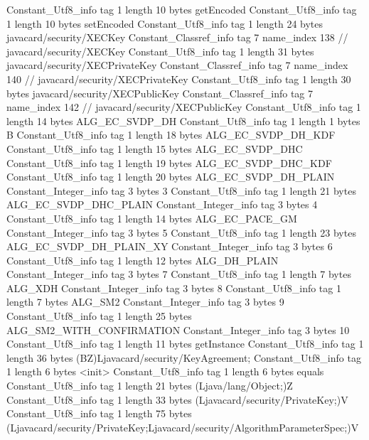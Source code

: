 {{{		}
		Constant_Utf8_info {
			tag	1
			length	10
			bytes	getEncoded
		}
		Constant_Utf8_info {
			tag	1
			length	10
			bytes	setEncoded
		}
		Constant_Utf8_info {
			tag	1
			length	24
			bytes	javacard/security/XECKey
		}
		Constant_Classref_info {
			tag	7
			name_index	138		// javacard/security/XECKey
		}
		Constant_Utf8_info {
			tag	1
			length	31
			bytes	javacard/security/XECPrivateKey
		}
		Constant_Classref_info {
			tag	7
			name_index	140		// javacard/security/XECPrivateKey
		}
		Constant_Utf8_info {
			tag	1
			length	30
			bytes	javacard/security/XECPublicKey
		}
		Constant_Classref_info {
			tag	7
			name_index	142		// javacard/security/XECPublicKey
		}
		Constant_Utf8_info {
			tag	1
			length	14
			bytes	ALG_EC_SVDP_DH
		}
		Constant_Utf8_info {
			tag	1
			length	1
			bytes	B
		}
		Constant_Utf8_info {
			tag	1
			length	18
			bytes	ALG_EC_SVDP_DH_KDF
		}
		Constant_Utf8_info {
			tag	1
			length	15
			bytes	ALG_EC_SVDP_DHC
		}
		Constant_Utf8_info {
			tag	1
			length	19
			bytes	ALG_EC_SVDP_DHC_KDF
		}
		Constant_Utf8_info {
			tag	1
			length	20
			bytes	ALG_EC_SVDP_DH_PLAIN
		}
		Constant_Integer_info {
			tag	3
			bytes	3
		}
		Constant_Utf8_info {
			tag	1
			length	21
			bytes	ALG_EC_SVDP_DHC_PLAIN
		}
		Constant_Integer_info {
			tag	3
			bytes	4
		}
		Constant_Utf8_info {
			tag	1
			length	14
			bytes	ALG_EC_PACE_GM
		}
		Constant_Integer_info {
			tag	3
			bytes	5
		}
		Constant_Utf8_info {
			tag	1
			length	23
			bytes	ALG_EC_SVDP_DH_PLAIN_XY
		}
		Constant_Integer_info {
			tag	3
			bytes	6
		}
		Constant_Utf8_info {
			tag	1
			length	12
			bytes	ALG_DH_PLAIN
		}
		Constant_Integer_info {
			tag	3
			bytes	7
		}
		Constant_Utf8_info {
			tag	1
			length	7
			bytes	ALG_XDH
		}
		Constant_Integer_info {
			tag	3
			bytes	8
		}
		Constant_Utf8_info {
			tag	1
			length	7
			bytes	ALG_SM2
		}
		Constant_Integer_info {
			tag	3
			bytes	9
		}
		Constant_Utf8_info {
			tag	1
			length	25
			bytes	ALG_SM2_WITH_CONFIRMATION
		}
		Constant_Integer_info {
			tag	3
			bytes	10
		}
		Constant_Utf8_info {
			tag	1
			length	11
			bytes	getInstance
		}
		Constant_Utf8_info {
			tag	1
			length	36
			bytes	(BZ)Ljavacard/security/KeyAgreement;
		}
		Constant_Utf8_info {
			tag	1
			length	6
			bytes	<init>
		}
		Constant_Utf8_info {
			tag	1
			length	6
			bytes	equals
		}
		Constant_Utf8_info {
			tag	1
			length	21
			bytes	(Ljava/lang/Object;)Z
		}
		Constant_Utf8_info {
			tag	1
			length	33
			bytes	(Ljavacard/security/PrivateKey;)V
		}
		Constant_Utf8_info {
			tag	1
			length	75
			bytes	(Ljavacard/security/PrivateKey;Ljavacard/security/AlgorithmParameterSpec;)V
}}}
